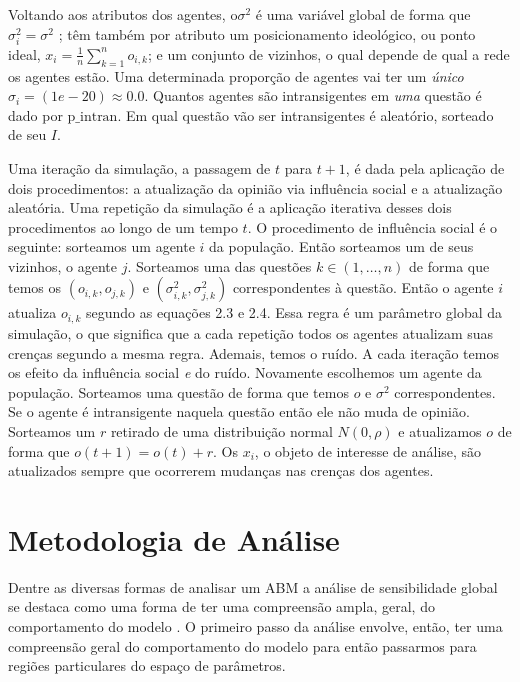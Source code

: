 Voltando aos atributos dos agentes, o\(\sigma^2\) é uma variável global de forma que
\(\sigma_i^2 = \sigma^2\) ; têm também por atributo um posicionamento ideológico, ou ponto
ideal, \(x_i = \frac{1}{n} \sum_{k = 1}^n o_{i,k} \); e um conjunto de vizinhos, o
qual depende de qual a rede os agentes estão. Uma determinada proporção de
agentes vai ter um \textit{único}\(\sigma_i = (1e-20 ) \approx 0.0 \). Quantos agentes são
intransigentes em \textit{uma} questão é dado por \(\text{p\_intran}\). Em qual
questão vão ser intransigentes é aleatório, sorteado de seu \(I\).

Uma iteração da simulação, a passagem de \(t\) para \(t+1\), é dada pela
aplicação de dois procedimentos: a atualização da opinião via influência social
e a atualização aleatória. Uma repetição da simulação é a aplicação iterativa
desses dois procedimentos ao longo de um tempo \(t \). O procedimento de
influência social é o seguinte: sorteamos um agente \(i\) da população. Então
sorteamos um de seus vizinhos, o agente \(j\). Sorteamos uma das questões \(k \in
(1,\ldots,n)\) de forma que temos os \((o_{i,k},o_{j,k})\) e
\((\sigma_{i,k}^2,\sigma_{j,k}^2)\) correspondentes à questão. Então o agente \(i\)
atualiza \(o_{i,k}\) segundo as equações 2.3 e 2.4. Essa regra é um parâmetro
global da simulação, o que significa que a cada repetição todos os agentes
atualizam suas crenças segundo a mesma regra. Ademais, temos o ruído. A cada
iteração temos os efeito da influência social \textit{e} do ruído. Novamente
escolhemos um agente da população. Sorteamos uma questão de forma que temos
\(o\) e \(\sigma^2\) correspondentes. Se o agente é intransigente naquela questão
então ele não muda de opinião. Sorteamos um \(r\) retirado de uma distribuição
normal \(N(0,\rho)\) e atualizamos \(o\) de forma que \(o(t+1) = o(t) + r\). Os
\(x_i\), o objeto de interesse de análise, são atualizados sempre que ocorrerem
mudanças nas crenças dos agentes.

\section{Metodologia de Análise}

Dentre as diversas formas de analisar um ABM a análise de sensibilidade global
se destaca como uma forma de ter uma compreensão ampla, geral, do comportamento
do modelo \cite{north2007managing}. O primeiro passo da análise envolve, então,
 ter uma compreensão geral do comportamento do modelo para então passarmos
para regiões particulares do espaço de parâmetros.


